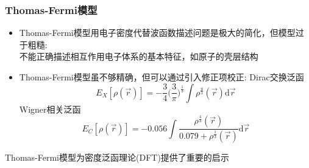 \documentclass[cjk,slidestop,compress,mathserif,blue]{beamer}
\begin{document}
\frame
{
	\frametitle{\textrm{Thomas-Fermi}模型}
	\begin{itemize}
		\item \textrm{Thomas-Fermi}模型用电子密度代替波函数描述问题是极大的简化，但模型过于粗糙:\\
			不能正确描述相互作用电子体系的基本特征，如原子的壳层结构
		\item \textrm{Thomas-Fermi}模型虽不够精确，但可以通过引入修正项校正:
			\textrm{Dirac}交换泛函 $$E_X[\rho(\vec r)]=-\dfrac34\bigg(\dfrac3{\pi}\bigg)^{\frac13}\int\rho^{\frac43}(\vec r)\mathrm{d}\vec r$$
			\textrm{Wigner}相关泛函 $$E_C[\rho(\vec r)]=-0.056\int\dfrac{\rho^{\frac43}(\vec r)}{0.079+\rho^{\frac13}(\vec r)}\mathrm{d}\vec r$$
	\end{itemize}
	\textrm{Thomas-Fermi}模型为密度泛函理论\textrm{(DFT)}提供了重要的启示
}
\end{document}
